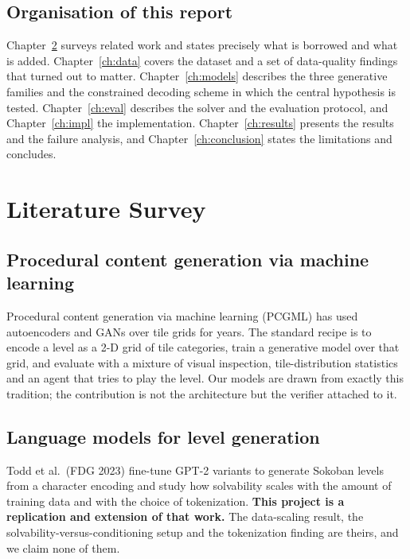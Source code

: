 \documentclass[11pt,a4paper]{report}
\begin{document}
\section{Organisation of this report}

Chapter~\ref{ch:lit} surveys related work and states precisely what is borrowed
and what is added. Chapter~\ref{ch:data} covers the dataset and a set of
data-quality findings that turned out to matter. Chapter~\ref{ch:models}
describes the three generative families and the constrained decoding scheme in
which the central hypothesis is tested. Chapter~\ref{ch:eval} describes the
solver and the evaluation protocol, and Chapter~\ref{ch:impl} the
implementation. Chapter~\ref{ch:results} presents the results and the failure
analysis, and Chapter~\ref{ch:conclusion} states the limitations and concludes.

\chapter{Literature Survey}
\label{ch:lit}

\section{Procedural content generation via machine learning}

Procedural content generation via machine learning (PCGML) has used
autoencoders and GANs over tile grids for years. The standard recipe is to
encode a level as a 2-D grid of tile categories, train a generative model over
that grid, and evaluate with a mixture of visual inspection, tile-distribution
statistics and an agent that tries to play the level. Our models are drawn from
exactly this tradition; the contribution is not the architecture but the
verifier attached to it.

\section{Language models for level generation}

Todd et al.\ (FDG 2023) fine-tune GPT-2 variants to generate Sokoban levels from
a character encoding and study how solvability scales with the amount of
training data and with the choice of tokenization. \textbf{This project is a
replication and extension of that work.} The data-scaling result, the
solvability-versus-conditioning setup and the tokenization finding are theirs,
and we claim none of them.
\end{document}
